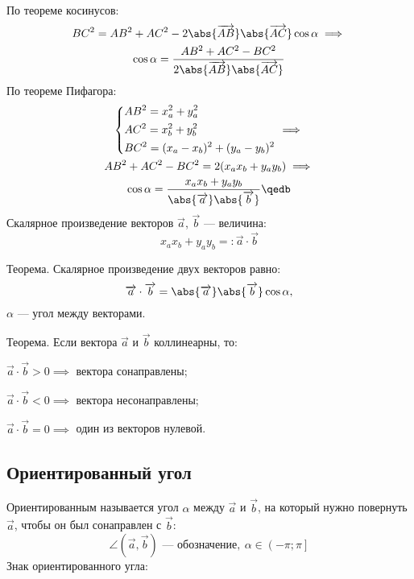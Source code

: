По теореме косинусов:
$$\begin{gathered}
BC^2=AB^2+AC^2-2\abs{\overrightarrow{AB}}\abs{\overrightarrow{AC}}\cos\alpha\implies\\
\cos\alpha=\frac{AB^2+AC^2-BC^2}{2\abs{\overrightarrow{AB}}\abs{\overrightarrow{AC}}}
\end{gathered}$$
По теореме Пифагора:
$$\begin{gathered}
\left\{\begin{aligned}
&AB^2=x_a^2+y_a^2\\
&AC^2=x_b^2+y_b^2\\
&BC^2=(x_a-x_b)^2+(y_a-y_b)^2
\end{aligned}\right.\implies\\
AB^2+AC^2-BC^2=2(x_ax_b+y_ay_b)\implies\\
\cos\alpha=\frac{x_ax_b+y_ay_b}{\abs{\overrightarrow{a}}\abs{\overrightarrow{b}}}\qedb
\end{gathered}$$
{\bold Скалярное произведение} {\ital векторов} $\overrightarrow{a}$, $\overrightarrow{b}$ --- величина:
$$x_ax_b+y_ay_b=:\overrightarrow{a}\cdot\overrightarrow{b}$$
\begin{theorem}
{\bold Теорема.} Скалярное произведение двух векторов равно:
$$\overrightarrow{a}\cdot\overrightarrow{b}=\abs{\overrightarrow{a}}\abs{\overrightarrow{b}}\cos\alpha,$$
$\alpha$ --- угол между векторами.
\end{theorem}

\begin{theorem}
{\bold Теорема.} Если вектора $\overrightarrow{a}$ и $\overrightarrow{b}$ коллинеарны, то:

\begin{list*}
\item$\overrightarrow{a}\cdot\overrightarrow{b}\greater 0\implies$ вектора {\ital сонаправлены};
\item$\overrightarrow{a}\cdot\overrightarrow{b}\less 0\implies$ вектора {\ital несонаправлены};
\item$\overrightarrow{a}\cdot\overrightarrow{b}=0\implies$ один из векторов {\ital нулевой}.
\end{list*}
\end{theorem}

\subsection{Ориентированный угол}

{\bold Ориентированным} называется угол $\alpha$ между $\overrightarrow{a}$ и $\overrightarrow{b}$, на который нужно повернуть $\overrightarrow{a}$, чтобы он был сонаправлен с $\overrightarrow{b}$:
$$\angle(\overrightarrow{a},\overrightarrow{b})\text{ --- обозначение},\ \alpha\in\left(-\pi;\pi\right]$$
{\bold Знак} ориентированного угла:

